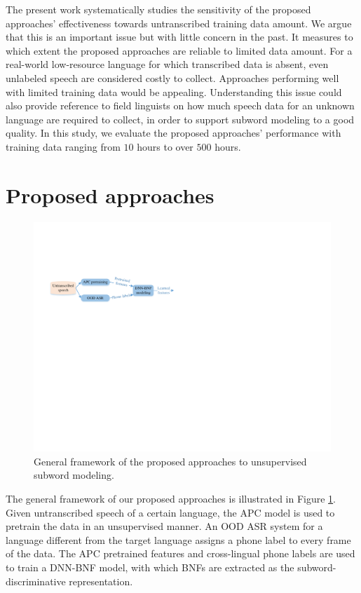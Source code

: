 \documentclass[a4paper]{article}
\begin{document}
The present work systematically studies the  sensitivity of the proposed approaches' effectiveness towards    untranscribed training data amount.  We argue that this is an important issue but with little concern in the past. 
It measures to which extent the proposed approaches are reliable to limited data amount. For a real-world low-resource language for which transcribed data is absent, 
even unlabeled speech are considered costly to collect. Approaches performing well with limited training data  would be appealing. 
Understanding this issue  could also provide reference to field linguists on how much speech data for an unknown language  are required to collect, in order to support subword modeling to a good quality. 
In this study, we evaluate the proposed approaches' performance with    training data ranging from $10$ hours to over $500$ hours.


\section{Proposed approaches}

\begin{figure}
    \centering
    \includegraphics[width=0.95\linewidth]{LaTeX/apc_framework.pdf}
    \caption{General framework of the proposed approaches to unsupervised subword modeling.  }
    \label{fig:general_framework}
\end{figure}
The general framework of our proposed approaches is illustrated in Figure \ref{fig:general_framework}. Given untranscribed speech of a certain  language, the APC  model is used to pretrain the data in an unsupervised manner. An OOD ASR system for a language different from the target language  assigns a phone label to every frame of the data. The APC pretrained features and  cross-lingual phone labels are used to train a DNN-BNF model, with which BNFs are extracted as the subword-discriminative representation.
\end{document}
